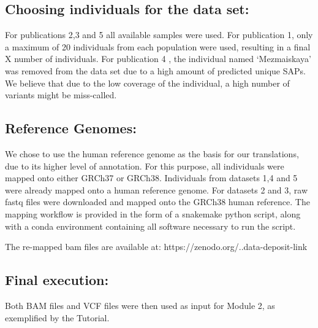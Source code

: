 \documentclass{book}
\begin{document}
\vspace{1.2}

\subsection{\large Choosing individuals for the data set:}

For publications 2,3 and 5 all available samples were used.
For publication 1, only a maximum of 20 individuals from each population were used, resulting in a final X number of individuals.
For publication 4 , the individual named ‘Mezmaiskaya’ was removed from the data set due to a high amount of predicted unique SAPs. We believe that due to the low coverage of the individual, a high number of variants might be miss-called.



\subsection{\large Reference Genomes:}

We chose to use the human reference genome as the basis for our translations, due to its higher level of annotation. For this purpose, all individuals were mapped onto either GRCh37\cite{church2011modernizing} or GRCh38\cite{schneider2017evaluation}. Individuals from datasets 1,4 and 5 were already mapped onto a human reference genome. For datasets 2 and 3, raw fastq files were downloaded and mapped onto the GRCh38  human reference. The mapping workflow is provided in the form of a snakemake python script, along with a conda environment containing all software necessary to run the script.

The re-mapped bam files are available at: https://zenodo.org/..data-deposit-link

\subsection{\large Final execution:}
Both BAM files and VCF files were then used as input for Module 2, as exemplified by the Tutorial.


















\end{document}
